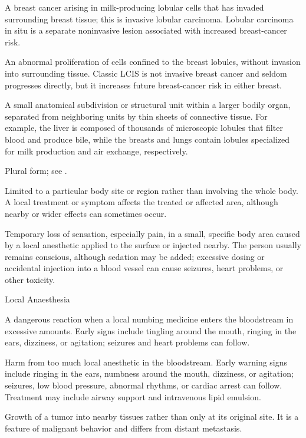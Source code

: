  A breast cancer arising in milk-producing lobular cells that has invaded surrounding breast tissue; this is invasive lobular carcinoma. Lobular carcinoma in situ is a separate noninvasive lesion associated with increased breast-cancer risk.

 An abnormal proliferation of cells confined to the breast lobules, without invasion into surrounding tissue. Classic LCIS is not invasive breast cancer and seldom progresses directly, but it increases future breast-cancer risk in either breast.

 A small anatomical subdivision or structural unit within a larger bodily organ, separated from neighboring units by thin sheets of connective tissue. For example, the liver is composed of thousands of microscopic lobules that filter blood and produce bile, while the breasts and lungs contain lobules specialized for milk production and air exchange, respectively.

 Plural form; see .

 Limited to a particular body site or region rather than involving the whole body. A local treatment or symptom affects the treated or affected area, although nearby or wider effects can sometimes occur.

 Temporary loss of sensation, especially pain, in a small, specific body area caused by a local anesthetic applied to the surface or injected nearby. The person usually remains conscious, although sedation may be added; excessive dosing or accidental injection into a blood vessel can cause seizures, heart problems, or other toxicity.

\synonyms
Local Anaesthesia

 A dangerous reaction when a local numbing medicine enters the bloodstream in excessive amounts. Early signs include tingling around the mouth, ringing in the ears, dizziness, or agitation; seizures and heart problems can follow.

 Harm from too much local anesthetic in the bloodstream. Early warning signs include ringing in the ears, numbness around the mouth, dizziness, or agitation; seizures, low blood pressure, abnormal rhythms, or cardiac arrest can follow. Treatment may include airway support and intravenous lipid emulsion.

 Growth of a tumor into nearby tissues rather than only at its original site. It is a feature of malignant behavior and differs from distant metastasis.

